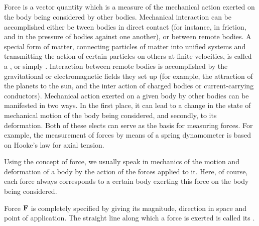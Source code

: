 \subsection{}\label{2.2.1}Force is a vector quantity which is a measure of the mechan­ical action exerted on the body being considered by other bodies. Mechanical interaction can be accomplished either be­ tween bodies in direct contact (for instance, in friction, and in the pressure of bodies against one another), or between remote bodies. A special form of matter, connecting particles of matter into unified systems and transmitting the action of certain par­ticles on others at finite velocities, is called a , or simply . Interaction between remote bodies is accomplished by the gravitational or electromagnetic fields they set up (for example, the attraction of the planets to the sun, and the inter­ action of charged bodies or current-carrying conductors). Me­chanical action exerted on a given body by other bodies can be manifested in two ways. In the first place, it can lead to a change in the state of mechanical motion of the body being consid­ered, and secondly, to its deformation. Both of these elects can serve as the basis for measuring forces. For example, the mea­surement of forces by means of a spring dynamometer is based on Hooke's law  for axial tension.

Using the concept of force, we usually speak in mechanics of the motion and deformation of a body by the action of the forces applied to it. Here, of course, each force always corresponds to a certain body exerting this force on the body being consid­ered.

Force $\vb{F}$ is completely specified by giving its magnitude, direction in space and point of application. The straight line along which a force is exerted is called its .

